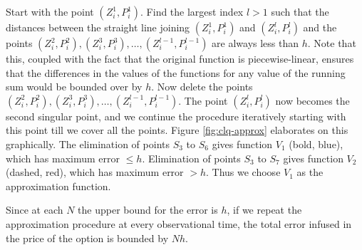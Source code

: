Start with the point $ ( Z_i^1, P_i^1 ) $. Find the largest index $ l > 1 $ such that the distances between the straight line joining $ ( Z_i^1, P_i^1 ) $ and $ ( Z_i^l, P_i^l ) $ and the points $ ( Z_i^2, P_i^2 ), ( Z_i^3, P_i^3 ), \dots, ( Z_i^{l-1}, P_i^{l-1} ) $ are always less than $ h $. Note that this, coupled with the fact that the original function is piecewise-linear, ensures that the differences in the values of the functions for any value of the running sum would be bounded over by $ h $. Now delete the points $ ( Z_i^2, P_i^2 ), ( Z_i^3, P_i^3 ), \dots, ( Z_i^{l-1}, P_i^{l-1} ) $. The point $ ( Z_i^l, P_i^l ) $ now becomes the second singular point, and we continue the procedure iteratively starting with this point till we cover all the points. Figure \ref{fig:clq-approx} elaborates on this graphically. The elimination of points $ S_3 $ to $ S_6 $ gives function $ V_1 $ (bold, blue), which has maximum error $ \le h $. Elimination of points $ S_3 $ to $ S_7 $ gives function $ V_2 $ (dashed, red), which has maximum error $ > h $. Thus we choose $ V_1 $ as the approximation function.

Since at each $ N $ the upper bound for the error is $ h $, if we repeat the approximation procedure at every observational time, the total error infused in the price of the option is bounded by $ Nh $.


